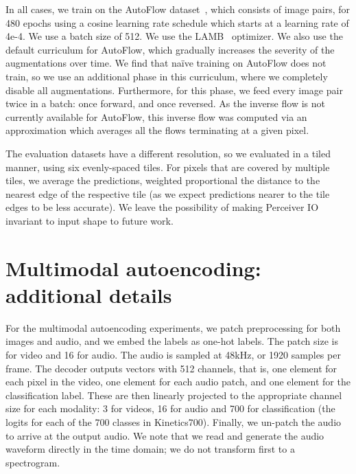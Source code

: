 \documentclass{article} \usepackage{iclr2022_conference,times}
\newcommand{\ourmodel}{Perceiver IO\xspace}
\begin{document}
In all cases, we train on the AutoFlow dataset~\citep{sun2021autoflow}, which consists of  image pairs, for 480 epochs using a cosine learning rate schedule which starts at a learning rate of 4e-4.  We use a batch size of 512.  We use the LAMB~\citep{you2019lamb} optimizer. We also use the default curriculum for AutoFlow, which gradually increases the severity of the augmentations over time. We find that na\"{i}ve training on AutoFlow does not train, so we use an additional phase in this curriculum, where we completely disable all augmentations.  Furthermore, for this phase, we feed every image pair twice in a batch: once forward, and once reversed.  As the inverse flow is not currently available for AutoFlow, this inverse flow was computed via an approximation which averages all the flows terminating at a given pixel.

The evaluation datasets have a different resolution, so we evaluated in a tiled manner, using six evenly-spaced tiles.  For pixels that are covered by multiple tiles, we average the predictions, weighted proportional the distance to the nearest edge of the respective tile (as we expect predictions nearer to the tile edges to be less accurate).  We leave the possibility of making \ourmodel{} invariant to input shape to future work.

\section{Multimodal autoencoding: additional details}
\label{sec:multimodal_supp}

For the multimodal autoencoding experiments, we patch preprocessing for both images and audio,
and we embed the labels as one-hot labels. The patch size is  for video
and 16 for audio. The audio is sampled at 48kHz, or 1920 samples per frame.
The decoder outputs  vectors with 512 channels,
that is, one element for each pixel in the video, one element for each audio patch, and one element for the classification label.
These are then linearly projected to the appropriate channel size for each modality:
3 for videos, 16 for audio and 700 for classification (the logits for each of the 700 classes in Kinetics700).
Finally, we un-patch the audio to arrive at the output audio.
We note that we read and generate the audio waveform directly in the time domain;
we do not transform first to a spectrogram.

\begin{table}
        \centering
{}
\vspace*{0.1cm}
\caption{\small \label{tab:autoencoding_supp} Additional details of the model used for Multimodal autoencoding.}
\vspace{-5pt}
\end{table}
\end{document}
